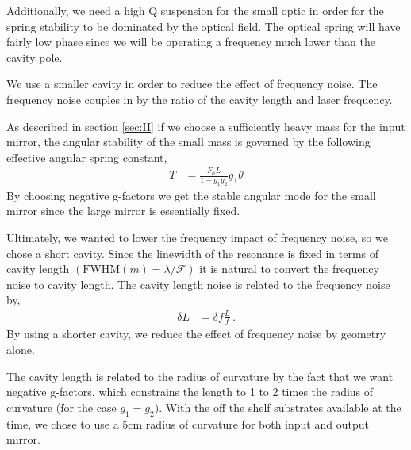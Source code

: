 %
%

Additionally, we need a high Q suspension for the small optic in order for the
spring stability to be dominated by the optical field.
The optical spring will have fairly low phase since we will be operating a
frequency much lower than the cavity pole.



%
%

We use a smaller cavity in order to reduce the effect of frequency noise.
The frequency noise couples in by the ratio of the cavity length and
laser frequency.


%
%

As described in section \ref{sec:II}  if we choose a sufficiently heavy mass for the
input mirror, the angular stability of the small mass is governed by the
following effective angular spring constant,
\begin{align}
T &= \frac{F_0 L}{1 - g_1 g_2} g_1 \theta
\end{align}
By choosing negative g-factors we get the stable angular mode for the small
mirror since the large mirror is essentially fixed.


%
%

Ultimately, we wanted to lower the frequency impact of frequency noise, so we
chose a short cavity.
Since the linewidth of the resonance is fixed in terms of cavity length
$ ( \mathrm{FWHM}(m) = \lambda / \mathcal{F} ) $ it is
natural to convert the frequency noise to cavity length.
The cavity length noise is related to the frequency noise by,
\begin{align}
\delta L &= \delta f \frac{L}{f} \, .
\end{align}
By using a shorter cavity, we reduce the effect of frequency noise by geometry
alone.

The cavity length is related to the radius of curvature by the fact that we want
negative g-factors, which constrains the length to 1 to 2 times the radius of
curvature (for the case $g_1 = g_2$).
With the off the shelf substrates available at the time, we chose to use a 5cm
radius of curvature for both input and output mirror.

